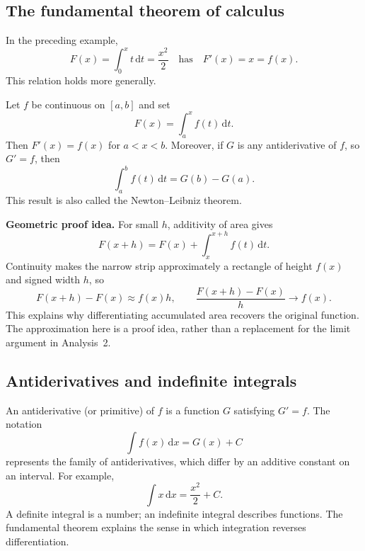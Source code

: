 \begin{center}
\end{center}

\subsection{The fundamental theorem of calculus}
In the preceding example,
\[
 F(x)=\int_0^x t\,\mathrm dt=\frac{x^2}{2}
 \quad\text{has}\quad F'(x)=x=f(x).
\]
This relation holds more generally.
\begin{theorem}
Let $f$ be continuous on $[a,b]$ and set
\[
 F(x)=\int_a^x f(t)\,\mathrm dt.
\]
Then $F'(x)=f(x)$ for $a<x<b$.
Moreover, if $G$ is any antiderivative of $f$, so $G'=f$, then
\[
 \boxed{\int_a^b f(t)\,\mathrm dt=G(b)-G(a)}.
\]
This result is also called the Newton--Leibniz theorem.
\end{theorem}

\textbf{Geometric proof idea.}
For small $h$, additivity of area gives
\[
 F(x+h)=F(x)+\int_x^{x+h}f(t)\,\mathrm dt.
\]
Continuity makes the narrow strip approximately a rectangle of height $f(x)$
and signed width $h$, so
\[
 F(x+h)-F(x)\approx f(x)h,
 \qquad \frac{F(x+h)-F(x)}h\longrightarrow f(x).
\]
This explains why differentiating accumulated area recovers the original
function. The approximation here is a proof idea, rather than a replacement
for the limit argument in Analysis~2.

\subsection{Antiderivatives and indefinite integrals}
An antiderivative (or primitive) of $f$ is a function $G$ satisfying $G'=f$.
The notation
\[
 \int f(x)\,\mathrm dx=G(x)+C
\]
represents the family of antiderivatives, which differ by an additive constant
on an interval. For example,
\[
 \int x\,\mathrm dx=\frac{x^2}{2}+C.
\]
A definite integral is a number; an indefinite integral describes functions.
The fundamental theorem explains the sense in which integration reverses
differentiation.

